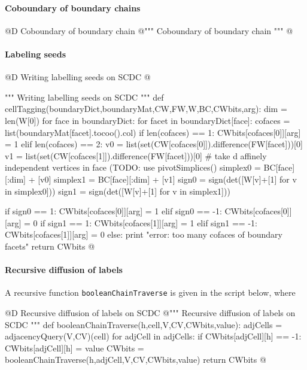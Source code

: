 \documentclass[11pt,oneside]{article}	%
\begin{document}
\paragraph{Coboundary of boundary chains}

@D Coboundary of boundary chain
@{""" Coboundary of boundary chain """
@}


\paragraph{Labeling seeds}

@D Writing labelling seeds on SCDC
@{""" Writing labelling seeds on SCDC """
def cellTagging(boundaryDict,boundaryMat,CW,FW,W,BC,CWbits,arg):
	dim = len(W[0])
	for face in boundaryDict:
		for facet in boundaryDict[face]:
			cofaces = list(boundaryMat[facet].tocoo().col)
			if len(cofaces) == 1: 
				CWbits[cofaces[0]][arg] = 1
			elif len(cofaces) == 2:
				v0 = list(set(CW[cofaces[0]]).difference(FW[facet]))[0]
				v1 = list(set(CW[cofaces[1]]).difference(FW[facet]))[0]
				# take d affinely independent vertices in face (TODO: use pivotSimplices() 
				simplex0 = BC[face][:dim] + [v0]
				simplex1 = BC[face][:dim] + [v1]
				sign0 = sign(det([W[v]+[1] for v in simplex0]))
				sign1 = sign(det([W[v]+[1] for v in simplex1]))
				
				if sign0 == 1: CWbits[cofaces[0]][arg] = 1
				elif sign0 == -1: CWbits[cofaces[0]][arg] = 0
				if sign1 == 1: CWbits[cofaces[1]][arg] = 1
				elif sign1 == -1: CWbits[cofaces[1]][arg] = 0
			else: 
				print "error: too many cofaces of boundary facets"
	return CWbits
@}


\paragraph{Recursive diffusion of labels}
A recursive function \texttt{booleanChainTraverse} is given in the script below, where 

@D Recursive diffusion of labels on SCDC
@{""" Recursive diffusion of labels on SCDC """
def booleanChainTraverse(h,cell,V,CV,CWbits,value):
	adjCells = adjacencyQuery(V,CV)(cell)
	for adjCell in adjCells: 
		if CWbits[adjCell][h] == -1:
			CWbits[adjCell][h] = value
			CWbits = booleanChainTraverse(h,adjCell,V,CV,CWbits,value)
	return CWbits
@}
\end{document}
